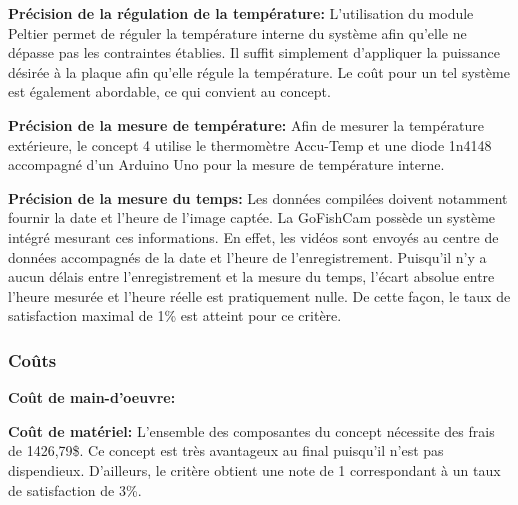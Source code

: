 \textbf{Précision de la régulation de la température:} L'utilisation du module Peltier permet de réguler la température interne du système afin qu'elle ne dépasse pas les contraintes établies. Il suffit simplement d'appliquer la puissance désirée à la plaque afin qu'elle régule la température. Le coût pour un tel système est également abordable, ce qui convient au concept.
\vspace{5mm}

\textbf{Précision de la mesure de température:} Afin de mesurer la température extérieure, le concept 4 utilise le thermomètre Accu-Temp et une diode 1n4148 accompagné d'un Arduino Uno pour la mesure de température interne. 
\vspace{5mm}

\textbf{Précision de la mesure du temps:} Les données compilées doivent notamment fournir la date et l'heure de l'image captée. La GoFishCam possède un système intégré mesurant ces informations. En effet, les vidéos sont envoyés au centre de données accompagnés de la date et l'heure de l'enregistrement. Puisqu'il n'y a aucun délais entre l'enregistrement et la mesure du temps, l'écart absolue entre l'heure mesurée et l'heure réelle est pratiquement nulle. De cette façon, le taux de satisfaction maximal de 1\% est atteint pour ce critère. 


\subsubsection{Coûts}

\textbf{Coût de main-d'oeuvre:}
\vspace{5mm}

\textbf{Coût de matériel:} L'ensemble des composantes du concept nécessite des frais de 1426,79\$. Ce concept est très avantageux au final puisqu'il n'est pas dispendieux. D'ailleurs, le critère obtient une note de 1 correspondant à un taux de satisfaction de 3\%.
\vspace{5mm}








